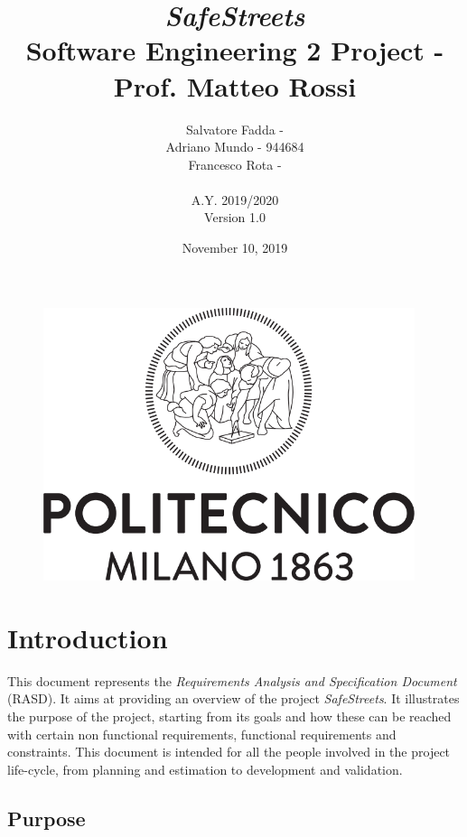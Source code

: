 \documentclass {article}
\begin{document}
\begin{figure}
\centering
	\includegraphics[height=8cm]{polimi_logo.png}
\end{figure}


\title {{\Huge \it SafeStreets} \\ \Large Software Engineering 2 Project - Prof. Matteo Rossi}
\author{Salvatore Fadda - \\Adriano Mundo - 944684 \\ Francesco Rota -
		\\ \\ A.Y. 2019/2020 \\ Version 1.0}
\date{November 10, 2019}



\maketitle
\newpage

	
\tableofcontents
\newpage


\section{Introduction}
This document represents the {\it Requirements Analysis and Specification Document} (RASD). It aims at providing an overview of the project {\it SafeStreets}. It illustrates the purpose of the project, starting from its goals and how these can be reached with certain non functional requirements, functional requirements and constraints. This document is intended for all the people involved in the project life-cycle, from planning and estimation to development and validation.

	
	\subsection{Purpose}
	
\end{document}
